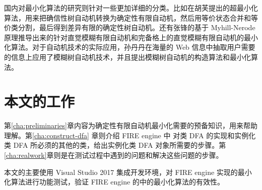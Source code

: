 国内对最小化算法的研究则针对一些更加详细的分类。比如在胡芙提出的超最小化算法，用来把确信性树自动机转换为确定性有限自动机，然后用等价状态合并和等价类分割，最后得到差异有限的确定性树自动机\cite{hfTreeFA}。还有张锋的基于 Myhill-Nerode 原理推导出来的针对直觉模糊有限自动机和完备格上的直觉模糊有限自动机的最小化算法\cite{zf14Min}。对于自动机技术的实际应用，孙丹丹在海量的 Web 信息中抽取用户需要的信息上应用了模糊树自动机技术，并且提出模糊树自动机的构造算法和最小化算法\cite{sdd14}。 

\section{本文的工作}

第\ref{cha:preliminaries}章内容为确定性有限自动机最小化需要的预备知识，用来帮助理解。第\ref{cha:construct-dfa} 章则介绍 FIRE engine 中 对类 DFA 的实现和实例化类 DFA 所必须的其他的类，给出实例化类 DFA 对象所需要的步骤。第\ref{cha:realwork}章则是在测试过程中遇到的问题和解决这些问题的步骤。

本文的主要使用 Visual Studio 2017 集成开发环境，对 FIRE engine 实现的最小化算法进行功能测试，验证 FIRE engine 的中的最小化算法的有效性。